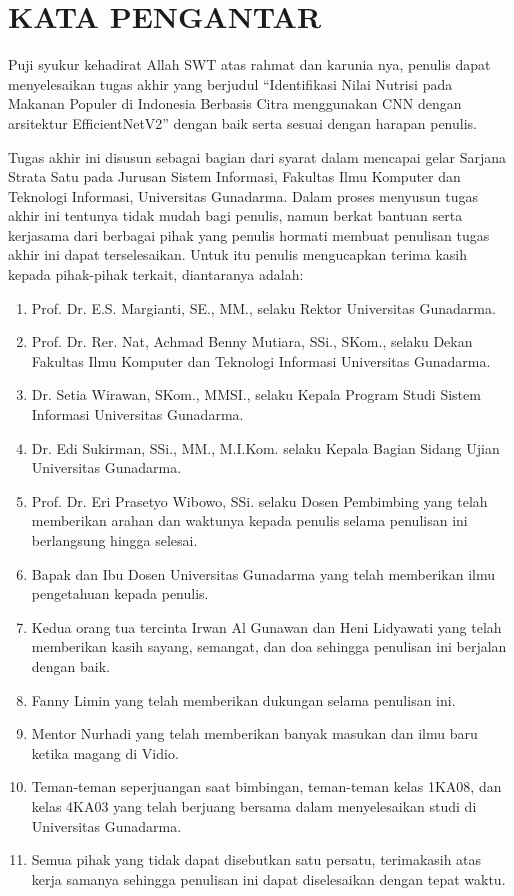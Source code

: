 \chapter*{KATA PENGANTAR}

Puji syukur kehadirat Allah SWT atas rahmat dan karunia nya, penulis dapat menyelesaikan tugas akhir yang berjudul “Identifikasi Nilai Nutrisi pada Makanan Populer di Indonesia Berbasis Citra menggunakan CNN dengan arsitektur EfficientNetV2” dengan baik serta sesuai dengan harapan penulis.

Tugas akhir ini disusun sebagai bagian dari syarat dalam mencapai gelar Sarjana Strata Satu pada Jurusan Sistem Informasi, Fakultas Ilmu Komputer dan Teknologi Informasi, Universitas Gunadarma. Dalam proses menyusun tugas akhir ini tentunya tidak mudah bagi penulis, namun berkat bantuan serta kerjasama dari berbagai pihak yang penulis hormati membuat penulisan tugas akhir ini dapat terselesaikan. Untuk itu penulis mengucapkan terima kasih kepada pihak-pihak terkait, diantaranya adalah:

\begin{enumerate}
    \item Prof. Dr. E.S. Margianti, SE., MM., selaku Rektor Universitas Gunadarma.
    \item Prof. Dr. Rer. Nat, Achmad Benny Mutiara, SSi., SKom., selaku Dekan Fakultas Ilmu Komputer dan Teknologi Informasi Universitas Gunadarma.
    \item Dr. Setia Wirawan, SKom., MMSI., selaku Kepala Program Studi Sistem Informasi Universitas Gunadarma.
    \item Dr. Edi Sukirman, SSi., MM., M.I.Kom. selaku Kepala Bagian Sidang Ujian Universitas Gunadarma.
    \item Prof. Dr. Eri Prasetyo Wibowo, SSi. selaku Dosen Pembimbing yang telah memberikan arahan dan waktunya kepada penulis selama penulisan ini berlangsung hingga selesai.
    \item Bapak dan Ibu Dosen Universitas Gunadarma yang telah memberikan ilmu pengetahuan kepada penulis.
    \item Kedua orang tua tercinta Irwan Al Gunawan dan Heni Lidyawati yang telah memberikan kasih sayang, semangat, dan doa sehingga penulisan ini berjalan dengan baik.
    \item Fanny Limin yang telah memberikan dukungan selama penulisan ini.
    \item Mentor Nurhadi yang telah memberikan banyak masukan dan ilmu baru ketika magang di Vidio.
    \item Teman-teman seperjuangan saat bimbingan, teman-teman kelas 1KA08, dan kelas 4KA03 yang telah berjuang bersama dalam menyelesaikan studi di Universitas Gunadarma.
    \item Semua pihak yang tidak dapat disebutkan satu persatu, terimakasih atas kerja samanya sehingga penulisan ini dapat diselesaikan dengan tepat waktu.
\end{enumerate}

